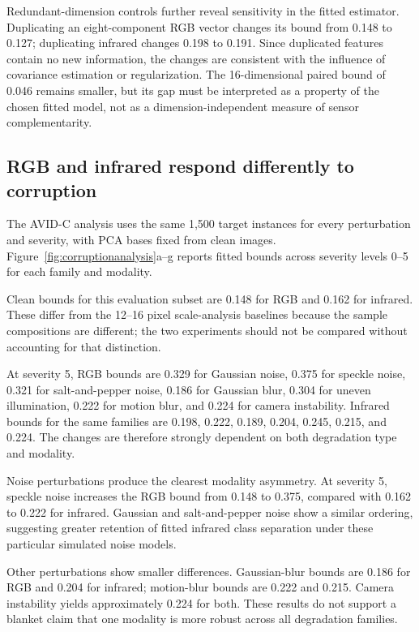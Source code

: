\documentclass[10pt]{article}
\newcommand{\corrupt}{\textsc{AVID-C}}
\begin{document}
Redundant-dimension controls further reveal sensitivity in the fitted estimator. Duplicating an eight-component RGB vector changes its bound from 0.148 to 0.127; duplicating infrared changes 0.198 to 0.191. Since duplicated features contain no new information, the changes are consistent with the influence of covariance estimation or regularization. The 16-dimensional paired bound of 0.046 remains smaller, but its gap must be interpreted as a property of the chosen fitted model, not as a dimension-independent measure of sensor complementarity.

\subsection{RGB and infrared respond differently to corruption}

The \corrupt{} analysis uses the same 1,500 target instances for every perturbation and severity, with PCA bases fixed from clean images. Figure~\ref{fig:corruptionanalysis}a--g reports fitted bounds across severity levels 0--5 for each family and modality.

Clean bounds for this evaluation subset are 0.148 for RGB and 0.162 for infrared. These differ from the 12--16 pixel scale-analysis baselines because the sample compositions are different; the two experiments should not be compared without accounting for that distinction.

At severity 5, RGB bounds are 0.329 for Gaussian noise, 0.375 for speckle noise, 0.321 for salt-and-pepper noise, 0.186 for Gaussian blur, 0.304 for uneven illumination, 0.222 for motion blur, and 0.224 for camera instability. Infrared bounds for the same families are 0.198, 0.222, 0.189, 0.204, 0.245, 0.215, and 0.224. The changes are therefore strongly dependent on both degradation type and modality.

Noise perturbations produce the clearest modality asymmetry. At severity 5, speckle noise increases the RGB bound from 0.148 to 0.375, compared with 0.162 to 0.222 for infrared. Gaussian and salt-and-pepper noise show a similar ordering, suggesting greater retention of fitted infrared class separation under these particular simulated noise models.

Other perturbations show smaller differences. Gaussian-blur bounds are 0.186 for RGB and 0.204 for infrared; motion-blur bounds are 0.222 and 0.215. Camera instability yields approximately 0.224 for both. These results do not support a blanket claim that one modality is more robust across all degradation families.
\end{document}
